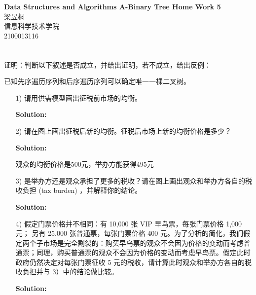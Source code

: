 \documentclass[11pt,a4paper,fleqn]{article}
\newcommand{\hwid}{5}
\newcommand{\name}{梁昱桐}
\newcommand{\institute}{信息科学技术学院}
\newcommand{\id}{2100013116}
\begin{document}
\pagestyle{fancy}
\chead{}

\setlength{\parindent}{0pt}

\begin{center}
	{\LARGE \bf Data Structures and Algorithms A-Binary Tree Home Work \hwid}\\
	{\Large \name}\\
	{\Large \institute}\\
	{\Large \id}\\
\end{center}

\section{}
证明：判断以下叙述是否成立，并给出证明，若不成立，给出反例：
	
已知先序遍历序列和后序遍历序列可以确定唯一一棵二叉树。

\begin{itemize}

	\item[1)]请用供需模型画出征税前市场的均衡。

	\textbf{Solution:}

	\item[2)]请在图上画出征税后新的均衡。征税后市场上新的均衡价格是多少？

    \textbf{Solution:}

	观众的均衡价格是500元，举办方能获得495元

	\item[3)]是举办方还是观众承担了更多的税收？请在图上画出观众和举办方各自的税收负担 (tax burden) ，并解释你的结论。

	\textbf{Solution:}
	
	\item[4)]假定门票价格并不相同：有 10,000 张 VIP 早鸟票，每张门票价格 1,000 元； 另有 25,000 张普通票，每张门票价格 400 元。为了分析的简化，我们假定两个子市场是完全割裂的：购买早鸟票的观众不会因为价格的变动而考虑普通票；同理，购买普通票的观众不会因为价格的变动而考虑早鸟票。假定此时政府仍然决定对每张门票征收 5 元的税收，请计算此时观众和举办方各自的税收负担并与 3）中的结论做比较。

	\textbf{Solution:}
	
\end{itemize}
\section{}


\clearpage
\end{document}
